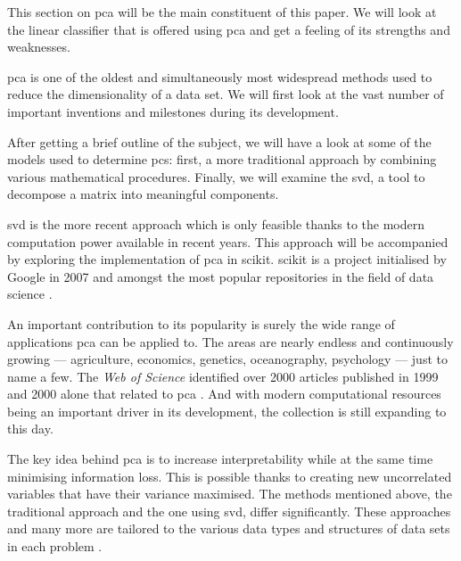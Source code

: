 This section on \gls{pca} will be the main constituent of this paper.
We will look at the linear classifier that is offered using \gls{pca} and get a feeling of its strengths and weaknesses.
\bigskip


\Gls{pca} is one of the oldest and simultaneously most widespread methods used to reduce the dimensionality of a data set.
We will first look at the vast number of important inventions and milestones during its development.

After getting a brief outline of the subject, we will have a look at some of the models used to determine \glspl{pc}: first, a more traditional approach by combining various mathematical procedures. 
Finally, we will examine the \gls{svd}, a tool to decompose a matrix into meaningful components.

\Gls{svd} is the more recent approach which is only feasible thanks to the modern computation power available in recent years.
This approach will be accompanied by exploring the implementation of \gls{pca} in \gls{scikit}.
\Gls{scikit} is a project initialised by Google in 2007 and amongst the most popular repositories in the field of data science \cite{scikit-learn}.
\bigskip


An important contribution to its popularity is surely the wide range of applications \gls{pca} can be applied to.
The areas are nearly endless and continuously growing --- agriculture, economics, genetics, oceanography, psychology --- just to name a few.
The \emph{Web of Science} identified over 2000 articles published in 1999 and 2000 alone that related to \gls{pca} \cite{Jolliffe2002book}.
And with modern computational resources being an important driver in its development, the collection is still expanding to this day.
\bigskip


The key idea behind \gls{pca} is to increase interpretability while at the same time minimising information loss. 
This is possible thanks to creating new uncorrelated variables that have their variance maximised.
The methods mentioned above, the traditional approach and the one using \gls{svd}, differ significantly. 
These approaches and many more are tailored to the various data types and structures of data sets in each problem \cite{jolliffe2016principal}.


